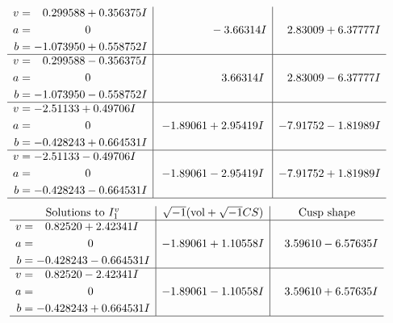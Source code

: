 \documentclass[1p]{elsarticle_modified}
\theoremstyle{definition}
\newcommand{\I}{\sqrt{-1}}
\begin{document}
$$\begin{array}{c|c|c}
\begin{aligned}
v &= \phantom{-}0.299588 + 0.356375 I \\
a &= \phantom{-0.000000 } 0 \\
b &= -1.073950 + 0.558752 I\end{aligned}
 & \phantom{-0.000000 } -3.66314 I & \phantom{-}2.83009 + 6.37777 I \\ \hline\begin{aligned}
v &= \phantom{-}0.299588 - 0.356375 I \\
a &= \phantom{-0.000000 } 0 \\
b &= -1.073950 - 0.558752 I\end{aligned}
 & \phantom{-0.000000 -}3.66314 I & \phantom{-}2.83009 - 6.37777 I \\ \hline\begin{aligned}
v &= -2.51133 + 0.49706 I \\
a &= \phantom{-0.000000 } 0 \\
b &= -0.428243 + 0.664531 I\end{aligned}
 & -1.89061 + 2.95419 I & -7.91752 - 1.81989 I \\ \hline\begin{aligned}
v &= -2.51133 - 0.49706 I \\
a &= \phantom{-0.000000 } 0 \\
b &= -0.428243 - 0.664531 I\end{aligned}
 & -1.89061 - 2.95419 I & -7.91752 + 1.81989 I\\
 \hline 
 \end{array}$$\newpage$$\begin{array}{c|c|c}  
\text{Solutions to }I^v_{1}& \I (\text{vol} + \sqrt{-1}CS) & \text{Cusp shape}\\
 \hline 
\begin{aligned}
v &= \phantom{-}0.82520 + 2.42341 I \\
a &= \phantom{-0.000000 } 0 \\
b &= -0.428243 - 0.664531 I\end{aligned}
 & -1.89061 + 1.10558 I & \phantom{-}3.59610 - 6.57635 I \\ \hline\begin{aligned}
v &= \phantom{-}0.82520 - 2.42341 I \\
a &= \phantom{-0.000000 } 0 \\
b &= -0.428243 + 0.664531 I\end{aligned}
 & -1.89061 - 1.10558 I & \phantom{-}3.59610 + 6.57635 I\\
 \hline 
 \end{array}$$\newpage
\end{document}
